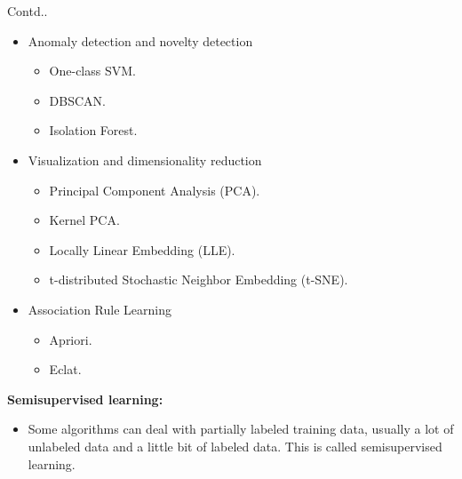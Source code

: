 \documentclass{beamer}
\begin{document}
\begin{frame}
\begin{block}{Contd..}
\begin{itemize}
    \item Anomaly detection and novelty detection
        \begin{itemize}
            \item One-class SVM.
            \item DBSCAN.
            \item Isolation Forest.
        \end{itemize}
    \item Visualization and dimensionality reduction
        \begin{itemize}
            \item Principal Component Analysis (PCA).
            \item Kernel PCA.
            \item Locally Linear Embedding (LLE).
            \item t-distributed Stochastic Neighbor Embedding (t-SNE).
        \end{itemize}
    \item Association Rule Learning
        \begin{itemize}
            \item Apriori.
            \item Eclat.
        \end{itemize}
\end{itemize}
\textbf{Semisupervised learning:}\\
\begin{itemize}
    \item Some algorithms can deal with partially labeled training data, usually a lot of unlabeled data and a little bit of labeled data. This is called semisupervised learning.
\end{itemize}
\end{block}
\end{frame}
\end{document}
